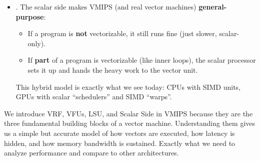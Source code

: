 \begin{itemize}
    \item {}. The scalar side makes VMIPS (and real vector machines) \textbf{general-purpose}:
    \begin{itemize}
        \item If a program is \textbf{not} vectorizable, it still runs fine (just slower, scalar-only).
        \item If \textbf{part} of a program is vectorizable (like inner loops), the scalar processor sets it up and hands the heavy work to the vector unit.
    \end{itemize}
    This hybrid model is exactly what we see today: CPUs with SIMD units, GPUs with scalar ``schedulers'' and SIMD ``warps''.
\end{itemize}
We introduce VRF, VFUs, LSU, and Scalar Side in VMIPS because they are the three fundamental building blocks of a vector machine. Understanding them gives us a simple but accurate model of how vectors are executed, how latency is hidden, and how memory bandwidth is sustained. Exactly what we need to analyze performance and compare to other architectures.